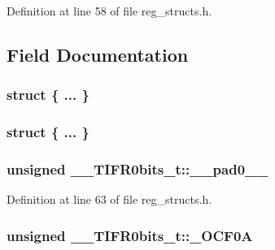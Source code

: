 Definition at line 58 of file reg\+\_\+structs.\+h.



\subsection{Field Documentation}
\hypertarget{union_____t_i_f_r0bits__t_a7af3c90f58ed02e6664d049fe8be1135}{\subsubsection[{"@11}]{\setlength{\rightskip}{0pt plus 5cm}struct \{ ... \} }}\label{union_____t_i_f_r0bits__t_a7af3c90f58ed02e6664d049fe8be1135}
\hypertarget{union_____t_i_f_r0bits__t_a7096079984a84dd10d8114e90d377517}{\subsubsection[{"@9}]{\setlength{\rightskip}{0pt plus 5cm}struct \{ ... \} }}\label{union_____t_i_f_r0bits__t_a7096079984a84dd10d8114e90d377517}
\hypertarget{union_____t_i_f_r0bits__t_aa10d093f97fa172bb08c6bd49467dd2e}{
\subsubsection[{\+\_\+\+\_\+pad0\+\_\+\+\_\+}]{\setlength{\rightskip}{0pt plus 5cm}unsigned \+\_\+\+\_\+\+T\+I\+F\+R0bits\+\_\+t\+::\+\_\+\+\_\+pad0\+\_\+\+\_\+}}\label{union_____t_i_f_r0bits__t_aa10d093f97fa172bb08c6bd49467dd2e}


Definition at line 63 of file reg\+\_\+structs.\+h.

\hypertarget{union_____t_i_f_r0bits__t_a27d783015db7c23037584dad289cd738}{
\subsubsection[{\+\_\+\+O\+C\+F0\+A}]{\setlength{\rightskip}{0pt plus 5cm}unsigned \+\_\+\+\_\+\+T\+I\+F\+R0bits\+\_\+t\+::\+\_\+\+O\+C\+F0\+A}}\label{union_____t_i_f_r0bits__t_a27d783015db7c23037584dad289cd738}


